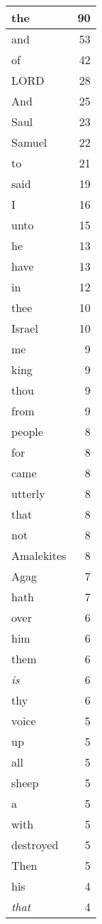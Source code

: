 \begin{center}
\begin{longtable}{l|r}
\hline \hline
\endlastfoot
the & 90 \\ \hline
and & 53 \\ \hline
of & 42 \\ \hline
LORD & 28 \\ \hline
And & 25 \\ \hline
Saul & 23 \\ \hline
Samuel & 22 \\ \hline
to & 21 \\ \hline
said & 19 \\ \hline
I & 16 \\ \hline
unto & 15 \\ \hline
he & 13 \\ \hline
have & 13 \\ \hline
in & 12 \\ \hline
thee & 10 \\ \hline
Israel & 10 \\ \hline
me & 9 \\ \hline
king & 9 \\ \hline
thou & 9 \\ \hline
from & 9 \\ \hline
people & 8 \\ \hline
for & 8 \\ \hline
came & 8 \\ \hline
utterly & 8 \\ \hline
that & 8 \\ \hline
not & 8 \\ \hline
Amalekites & 8 \\ \hline
Agag & 7 \\ \hline
hath & 7 \\ \hline
over & 6 \\ \hline
him & 6 \\ \hline
them & 6 \\ \hline
\emph{is} & 6 \\ \hline
thy & 6 \\ \hline
voice & 5 \\ \hline
up & 5 \\ \hline
all & 5 \\ \hline
sheep & 5 \\ \hline
a & 5 \\ \hline
with & 5 \\ \hline
destroyed & 5 \\ \hline
Then & 5 \\ \hline
his & 4 \\ \hline
\emph{that} & 4 \\ \hline

\end{longtable}
\end{center}
